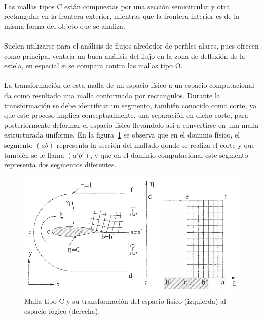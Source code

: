 \documentclass[letterpaper, openright, 12pt]{book}
\begin{document}
    \paragraph*{}
    Las mallas tipos C están compuestas por una sección semicircular y otra
    rectangular en la frontera exterior, mientras que la frontera interior
    es de la misma forma del objeto que se analiza.

    \paragraph*{}
    Suelen utilizarse para el análisis de flujos alrededor de perfiles
    alares, pues ofrecen como principal ventaja un buen análisis del flujo
    en la zona de deflexión de la estela, en especial si se compara contra
    las mallas tipo O.\cite{best-practices-grid-generation}

    \paragraph{}
    La transformación de esta malla de un espacio físico a un espacio
    computacional da como resultado una malla conformada por rectangulos.
    Durante la transformación se debe identificar un segmento, también
    conocido como corte, ya que este proceso implica conceptualmente, una
    separación en dicho corte, para posteriormente deformar el espacio
    físico llevándolo así a convertirse en una malla estructurada uniforme.
    En la figura~\ref{fig:malla-c} se observa que en el dominio físico, el
    segmento $(ab)$ representa la sección del mallado donde se realiza el
    corte y que también se le llama $(a'b')$, y que en el dominio
    computacional este segmento representa dos segmentos diferentes.
    \begin{figure}[htbp!]
        \centering
        \includegraphics[keepaspectratio, width=155mm]{./Imagenes/malla-c}
        \captionsetup{justification=centering, margin=2cm}
        \caption[Malla tipo C]{Malla tipo C y su transformación del espacio
            físico (izquierda) al espacio lógico (derecha).~\cite{blazek}}
        \label{fig:malla-c}
    \end{figure}
\end{document}

